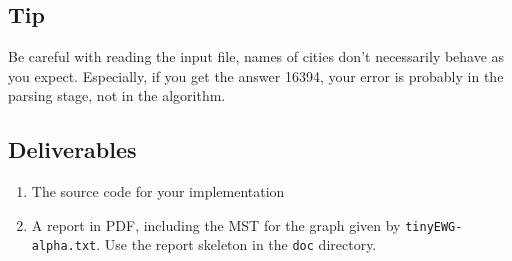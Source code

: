 \documentclass{tufte-handout}
\begin{document}
\subsection{Tip}

Be careful with reading the input file, names of cities don't necessarily behave as you expect. Especially, if you get the answer 16394, your error is probably in the parsing stage, not in the algorithm. 


\subsection{Deliverables}

\begin{enumerate}
  \item The source code for your implementation
  \item A report in PDF, including the MST for the graph given by \verb!tinyEWG-alpha.txt!.
  Use the report skeleton in the {\tt doc} directory.
  \end{enumerate}
\end{document}
